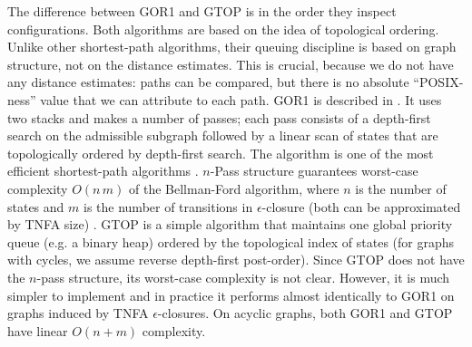 \documentclass[AMA,STIX1COL]{WileyNJD-v2}
\begin{document}
The difference between GOR1 and GTOP is in the order they inspect configurations.
%
Both algorithms are based on the idea of topological ordering.
Unlike other shortest-path algorithms, their queuing discipline is based on graph structure, not on the distance estimates.
This is crucial, because we do not have any distance estimates:
paths can be compared, but there is no absolute ``POSIX-ness'' value that we can attribute to each path.
%
GOR1 is described in \cite{GR93}.
It uses two stacks and makes a number of passes;
each pass consists of a depth-first search on the admissible subgraph
followed by a linear scan of states that are topologically ordered by depth-first search.
The algorithm is one of the most efficient shortest-path algorithms \cite{CGR96}.
$n$-Pass structure guarantees worst-case complexity $O(n \, m)$ of the Bellman-Ford algorithm,
where $n$ is the number of states and $m$ is the number of transitions in $\epsilon$-closure
(both can be approximated by TNFA size) \cite{CGGTW09}.
%
GTOP is a simple algorithm that maintains one global priority queue (e.g. a binary heap)
ordered by the topological index of states (for graphs with cycles, we assume reverse depth-first post-order).
Since GTOP does not have the $n$-pass structure, its worst-case complexity is not clear.
However, it is much simpler to implement
and in practice it performs almost identically to GOR1 on graphs induced by TNFA $\epsilon$-closures.
%
On acyclic graphs, both GOR1 and GTOP have linear $O(n + m)$ complexity.
\\
\end{document}
